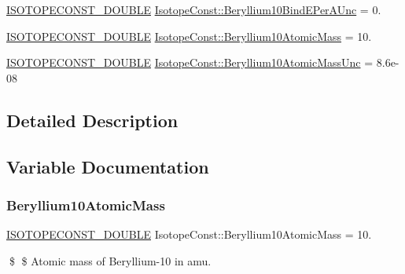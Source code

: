 \begin{DoxyCompactItemize}
\mbox{\hyperlink{group___isotope_const-_macros_ga8f45a7272ce02c0b4c65c44636ed719a}{I\+S\+O\+T\+O\+P\+E\+C\+O\+N\+S\+T\+\_\+\+D\+O\+U\+B\+LE}} \mbox{\hyperlink{group___isotope_const-_beryllium-_be10_gae83a181eeb87d1f01d882fa57bdeeaff}{Isotope\+Const\+::\+Beryllium10\+Bind\+E\+Per\+A\+Unc}} = 0.
\item 
\mbox{\hyperlink{group___isotope_const-_macros_ga8f45a7272ce02c0b4c65c44636ed719a}{I\+S\+O\+T\+O\+P\+E\+C\+O\+N\+S\+T\+\_\+\+D\+O\+U\+B\+LE}} \mbox{\hyperlink{group___isotope_const-_beryllium-_be10_gaa8f85ac2ce76782e4da37b55120733ec}{Isotope\+Const\+::\+Beryllium10\+Atomic\+Mass}} = 10.
\item 
\mbox{\hyperlink{group___isotope_const-_macros_ga8f45a7272ce02c0b4c65c44636ed719a}{I\+S\+O\+T\+O\+P\+E\+C\+O\+N\+S\+T\+\_\+\+D\+O\+U\+B\+LE}} \mbox{\hyperlink{group___isotope_const-_beryllium-_be10_ga57d88d2d6d4d2beb946d68562f001152}{Isotope\+Const\+::\+Beryllium10\+Atomic\+Mass\+Unc}} = 8.\+6e-\/08
\end{DoxyCompactItemize}


\subsection{Detailed Description}


\subsection{Variable Documentation}
\mbox{\label{group___isotope_const-_beryllium-_be10_gaa8f85ac2ce76782e4da37b55120733ec}} 
\subsubsection{\texorpdfstring{Beryllium10\+Atomic\+Mass}{Beryllium10AtomicMass}}
{\footnotesize\ttfamily \mbox{\hyperlink{group___isotope_const-_macros_ga8f45a7272ce02c0b4c65c44636ed719a}{I\+S\+O\+T\+O\+P\+E\+C\+O\+N\+S\+T\+\_\+\+D\+O\+U\+B\+LE}} Isotope\+Const\+::\+Beryllium10\+Atomic\+Mass = 10.}

\$ \$ Atomic mass of Beryllium-\/10 in amu. \mbox{\label{group___isotope_const-_beryllium-_be10_ga57d88d2d6d4d2beb946d68562f001152}} 
